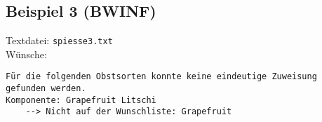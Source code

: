 \subsection{Beispiel 3 (BWINF)}\label{example:3}
Textdatei: \texttt{spiesse3.txt}\\

\noindent
Wünsche: \\

\noindent
{}
\begin{verbatim}
Für die folgenden Obstsorten konnte keine eindeutige Zuweisung gefunden werden.
Komponente: Grapefruit Litschi 
	--> Nicht auf der Wunschliste: Grapefruit 
\end{verbatim}
